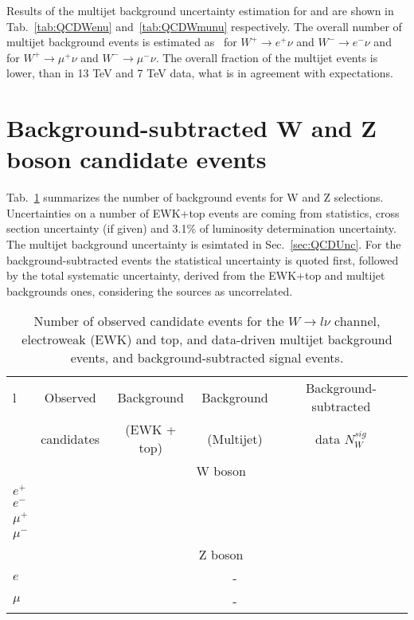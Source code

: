 Results of the multijet background uncertainty estimation for \wenu and \wmunu are shown in Tab.~\ref{tab:QCDWenu} and~\ref{tab:QCDWmunu} respectively. The overall number of multijet background events is estimated as \nQCDWplusenu\,  for $W^{+}\to e^{+}\nu$ and $W^{-}\to e^{-}\nu$ and \nQCDWplusmunu\,   for $W^{+}\to \mu^{+}\nu$ and $W^{-}\to \mu^{-}\nu$. The overall fraction of the multijet events is lower, than in 13 TeV \cite{a13TeV} and 7 TeV \cite{a7TeV} data, what is in agreement with expectations.



\section{Background-subtracted W and Z boson candidate events}

Tab.~\ref{tab:BkgWlnu} summarizes the number of background events for W and Z selections. Uncertainties on a number of EWK+top events are coming from statistics, cross section uncertainty (if given) and 3.1\% of luminosity determination uncertainty. The multijet background uncertainty is esimtated in Sec.~\ref{sec:QCDUnc}. For the background-subtracted events the statistical uncertainty is quoted first, followed by the total systematic uncertainty, derived from the EWK+top and multijet backgrounds ones, considering the sources as uncorrelated. 



\begin{table}[!h]
    \caption{Number of observed candidate events for the $W \to l\nu$ channel, electroweak (EWK) and top, and data-driven multijet background events, and background-subtracted signal events.}
	\label{tab:BkgWlnu}
	\begin{center}
		\begin{tabular}{l || c || c | c || c  }
		\hline
		l & Observed & Background & Background & Background-subtracted \\
		 & candidates & (EWK + top) & (Multijet) & data $N_{W}^{sig}$ \\
		 \hline
		 \hline
		 & \multicolumn{4}{c}{W boson}\\
		 \hline
		 $e^{+}$ & \ntotWplusenu & \nEWttbarbkgWplusenu & \nQCDWplusenu & \ntotsignalWplusenu \\
		 $e^{-}$ & \ntotWminenu & \nEWttbarbkgWminenu & \nQCDWminenu & \ntotsignalWminenu \\
		 $\mu^{+}$ & \ntotWplusmunu & \nEWttbarbkgWplusmunu & \nQCDWplusmunu & \ntotsignalWplusmunu \\
		 $\mu^{-}$ & \ntotWminmunu &\nEWttbarbkgWminmunu & \nQCDWminmunu & \ntotsignalWminmunu \\
		 \hline
		 \hline
		 & \multicolumn{4}{c}{Z boson}\\
		 \hline
		 $e$ & \ntotZee & \nEWttbarbkgZee  & - &\ntotsignalZee \\
		 $\mu$ & \ntotZmumu &\nEWttbarbkgZmumu  & - & \ntotsignalZmumu \\
		 \hline
		 \end{tabular}
   \end{center}
\end{table}

